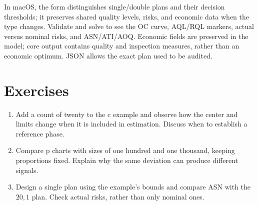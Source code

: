 In macOS, the form distinguishes single/double plans and their decision
thresholds; it preserves shared quality levels, risks, and economic data when
the type changes. Validate and solve to see the OC curve, AQL/RQL markers,
actual versus nominal risks, and ASN/ATI/AOQ. Economic fields are preserved
in the model; core output contains quality and inspection measures, rather
than an economic optimum. JSON allows the exact plan used to be audited.

\section{Exercises}
\begin{enumerate}
\item Add a count of twenty to the c example and observe how the center and
limits change when it is included in estimation. Discuss when to establish a
reference phase.
\item Compare p charts with sizes of one hundred and one thousand, keeping
proportions fixed. Explain why the same deviation can produce different signals.
\item Design a single plan using the example's bounds and compare ASN with
the \(20,1\) plan. Check actual risks, rather than only nominal ones.
\end{enumerate}
